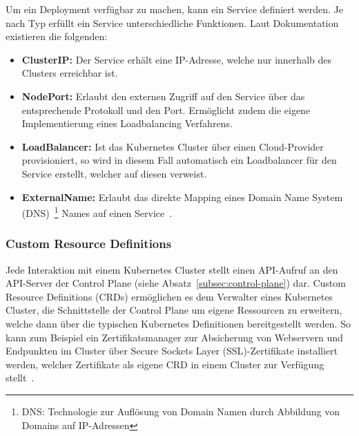 Um ein Deployment verfügbar zu machen, kann ein Service definiert werden.
Je nach Typ erfüllt ein Service unterschiedliche Funktionen.
Laut Dokumentation~\cite{kubernetesservices} existieren die folgenden:

\begin{itemize}
    \item \textbf{ClusterIP:} Der Service erhält eine IP-Adresse, welche nur innerhalb des Clusters erreichbar ist.
    \item \textbf{NodePort:} Erlaubt den externen Zugriff auf den Service über das entsprechende Protokoll und den Port.
    Ermöglicht zudem die eigene Implementierung eines Loadbalancing Verfahrens.
    \item \textbf{LoadBalancer:} Ist das Kubernetes Cluster über einen Cloud-Provider provisioniert, so wird in diesem Fall automatisch ein Loadbalancer für den Service erstellt, welcher auf diesen verweist.
    \item \textbf{ExternalName:} Erlaubt das direkte Mapping eines Domain Name System (DNS)~\footnote{DNS: Technologie zur Auflösung von Domain Namen durch Abbildung von Domains auf IP-Adressen} Names auf einen Service~\cite{kubernetesservices}.
\end{itemize}

\subsubsection{Custom Resource Definitions}
Jede Interaktion mit einem Kubernetes Cluster stellt einen API-Aufruf an den API-Server der Control Plane (siehe Absatz~\ref{subsec:control-plane}) dar.
Custom Resource Definitions (CRDs) ermöglichen es dem Verwalter eines Kubernetes Cluster, die Schnittstelle der Control Plane um eigene Ressourcen zu erweitern, welche dann über die typischen Kubernetes Definitionen bereitgestellt werden.
So kann zum Beispiel ein Zertifikatsmanager zur Absicherung von Webservern und Endpunkten im Cluster über Secure Sockets Layer (SSL)-Zertifikate installiert werden, welcher Zertifikate als eigene CRD in einem Cluster zur Verfügung stellt~\cite{certman}.

\newpage
